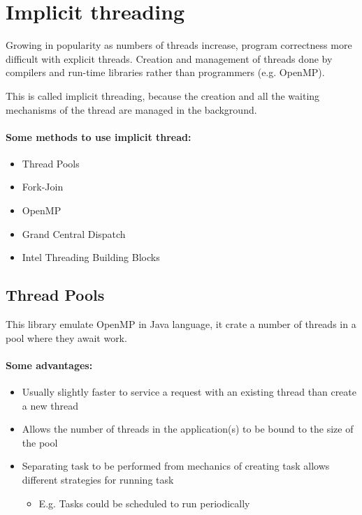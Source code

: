 \newpage
\section{Implicit threading}

Growing in popularity as numbers of threads increase, program correctness more difficult with explicit threads. Creation and management of threads done by compilers and run-time libraries rather than programmers (e.g. OpenMP).

This is called implicit threading, because the creation and all the waiting mechanisms of the thread are managed in the background.

\paragraph{Some methods to use implicit thread:}
\begin{itemize}
    \item Thread Pools
    \item Fork-Join
    \item OpenMP
    \item Grand Central Dispatch
    \item Intel Threading Building Blocks
\end{itemize}

\subsection{Thread Pools}

This library emulate OpenMP in Java language, it crate  a number of threads in a pool where they await work.

\paragraph{Some advantages:}

\begin{itemize}
    \item Usually slightly faster to service a request with an existing thread than create a new thread
    \item Allows the number of threads in the application(s) to be bound to the size of the pool
    \item Separating task to be performed from mechanics of creating task allows different strategies for running task
        \begin{itemize}
            \item[] E.g. Tasks could be scheduled to run periodically
        \end{itemize}
\end{itemize}

